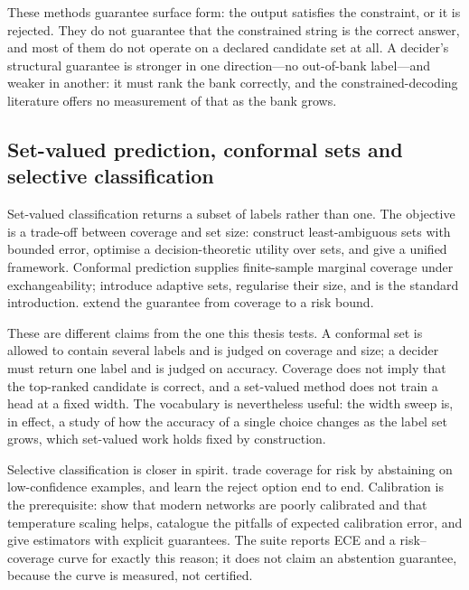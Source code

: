 These methods guarantee surface form: the output satisfies the constraint, or it
is rejected. They do not guarantee that the constrained string is the correct
answer, and most of them do not operate on a declared candidate set at all. A
decider's structural guarantee is stronger in one direction---no out-of-bank
label---and weaker in another: it must rank the bank correctly, and the
constrained-decoding literature offers no measurement of that as the bank grows.

\subsection{Set-valued prediction, conformal sets and selective classification}

Set-valued classification returns a subset of labels rather than one. The
objective is a trade-off between coverage and set size:
\citet{sadinle2019least} construct least-ambiguous sets with bounded error,
\citet{mortier2021efficient} optimise a decision-theoretic utility over sets, and
\citet{chzhen2021set} give a unified framework. Conformal prediction supplies
finite-sample marginal coverage under exchangeability; \citet{romano2020classification}
introduce adaptive sets, \citet{angelopoulos2021uncertainty} regularise their size,
and \citet{angelopoulos2023gentle} is the standard introduction.
\citet{bates2021risk} extend the guarantee from coverage to a risk bound.

These are different claims from the one this thesis tests. A conformal set is
allowed to contain several labels and is judged on coverage and size; a decider
must return one label and is judged on accuracy. Coverage does not imply that the
top-ranked candidate is correct, and a set-valued method does not train a head at
a fixed width. The vocabulary is nevertheless useful: the width sweep is, in
effect, a study of how the accuracy of a single choice changes as the label set
grows, which set-valued work holds fixed by construction.

Selective classification is closer in spirit. \citet{geifman2017selective} trade
coverage for risk by abstaining on low-confidence examples, and
\citet{geifman2019selectivenet} learn the reject option end to end. Calibration is
the prerequisite: \citet{guo2017calibration} show that modern networks are poorly
calibrated and that temperature scaling helps, \citet{nixon2019measuring} catalogue
the pitfalls of expected calibration error, and \citet{kumar2019verified} give
estimators with explicit guarantees. The suite reports ECE and a risk--coverage
curve for exactly this reason; it does not claim an abstention guarantee, because
the curve is measured, not certified.

